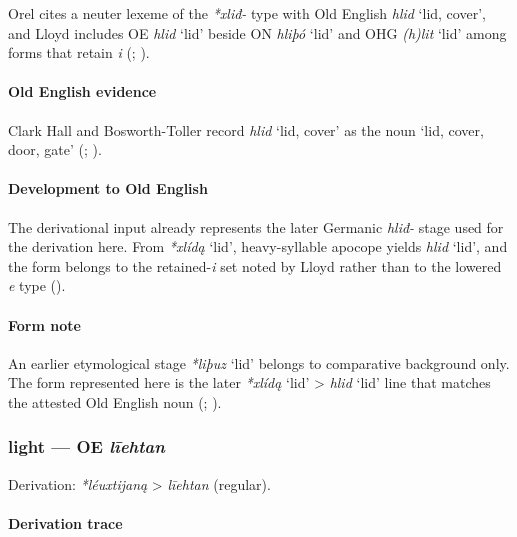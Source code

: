 \documentclass[
  british,
  a4paper,
]{article}
\providecommand{\Recon}[1]{\emph{*#1}}
\begin{document}
Orel cites a neuter lexeme of the \emph{*xliđ-} type with Old English
{\emph{hlid}} `lid, cover', and Lloyd includes OE \emph{hlid} `lid'
beside ON \emph{hliþó} `lid' and OHG \emph{(h)lit} `lid' among forms
that retain \emph{i} (;
).

\paragraph{Old English evidence}\label{old-english-evidence-44}

Clark Hall and Bosworth-Toller record {\emph{hlid}} `lid, cover' as the
noun `lid, cover, door, gate' (; ).

\paragraph{Development to Old
English}\label{development-to-old-english-44}

The derivational input already represents the later Germanic
\emph{hliđ-} stage used for the derivation here. From \Recon{xlídą}
`lid', heavy-syllable apocope yields \emph{hlid} `lid', and the form
belongs to the retained-\emph{i} set noted by Lloyd rather than to the
lowered \emph{e} type ().

\paragraph{Form note}\label{form-note-11}

An earlier etymological stage \Recon{liþuz} `lid' belongs to comparative
background only. The form represented here is the later \Recon{xlídą}
`lid' \textgreater{} \emph{hlid} `lid' line that matches the attested
Old English noun (;
).

\subsubsection{\texorpdfstring{light --- OE
\emph{līehtan}}{light --- OE līehtan}}\label{light-oe-lux12behtan}

Derivation: \emph{*léuxtijaną} \textgreater{} \emph{līehtan} (regular).

\paragraph{Derivation trace}\label{derivation-trace-54}
\end{document}
